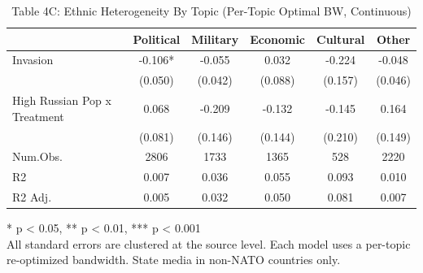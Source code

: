 \begin{table}[!t]
\caption{Table 4C: Ethnic Heterogeneity By Topic (Per-Topic Optimal BW, Continuous)} 
\fontsize{12.0pt}{14.4pt}\selectfont
\begin{tabular*}{\linewidth}{@{\extracolsep{\fill}}lccccc}
\toprule
  & Political & Military & Economic & Cultural & Other \\ 
\midrule\addlinespace[2.5pt]
Invasion & -0.106* & -0.055 & 0.032 & -0.224 & -0.048 \\ 
 & (0.050) & (0.042) & (0.088) & (0.157) & (0.046) \\ 
High Russian Pop x Treatment & 0.068 & -0.209 & -0.132 & -0.145 & 0.164 \\ 
{} & {(0.081)} & {(0.146)} & {(0.144)} & {(0.210)} & {(0.149)} \\ 
Num.Obs. & 2806 & 1733 & 1365 & 528 & 2220 \\ 
R2 & 0.007 & 0.036 & 0.055 & 0.093 & 0.010 \\ 
R2 Adj. & 0.005 & 0.032 & 0.050 & 0.081 & 0.007 \\ 
\bottomrule
\end{tabular*}
\begin{minipage}{\linewidth}
* p < 0.05, ** p < 0.01, *** p < 0.001\\
All standard errors are clustered at the source level. Each model uses a
per-topic re-optimized bandwidth. State media in non-NATO countries only.\\
\end{minipage}
\end{table}

